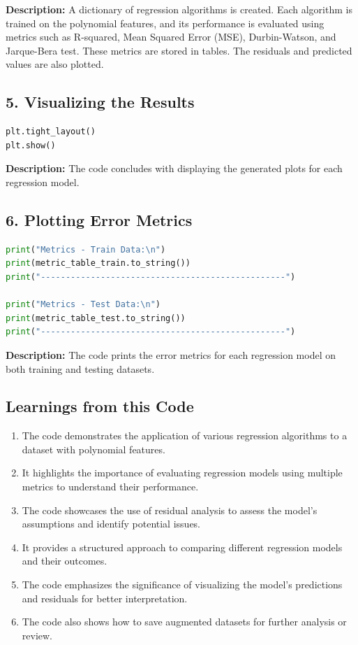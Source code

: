\textbf{Description:} A dictionary of regression algorithms is created. Each algorithm is trained on the polynomial features, and its performance is evaluated using metrics such as R-squared, Mean Squared Error (MSE), Durbin-Watson, and Jarque-Bera test. These metrics are stored in tables. The residuals and predicted values are also plotted.

\subsection*{5. Visualizing the Results}
\begin{lstlisting}[language=Python, caption={Visualizing the Results}]
plt.tight_layout()
plt.show()
\end{lstlisting}
\textbf{Description:} The code concludes with displaying the generated plots for each regression model.

\subsection*{6. Plotting Error Metrics}
\begin{lstlisting}[language=Python, caption={Plotting Error Metrics}]
print("Metrics - Train Data:\n")
print(metric_table_train.to_string())
print("-------------------------------------------------")

print("Metrics - Test Data:\n")
print(metric_table_test.to_string())
print("-------------------------------------------------")
\end{lstlisting}

\textbf{Description:} The code prints the error metrics for each regression model on both training and testing datasets.

\subsection*{Learnings from this Code}

\begin{enumerate}[label=(\alph*)]
	\item The code demonstrates the application of various regression algorithms to a dataset with polynomial features.
	\item It highlights the importance of evaluating regression models using multiple metrics to understand their performance.
	\item The code showcases the use of residual analysis to assess the model's assumptions and identify potential issues.
	\item It provides a structured approach to comparing different regression models and their outcomes.
	\item The code emphasizes the significance of visualizing the model's predictions and residuals for better interpretation.
	\item The code also shows how to save augmented datasets for further analysis or review.
\end{enumerate}

\clearpage